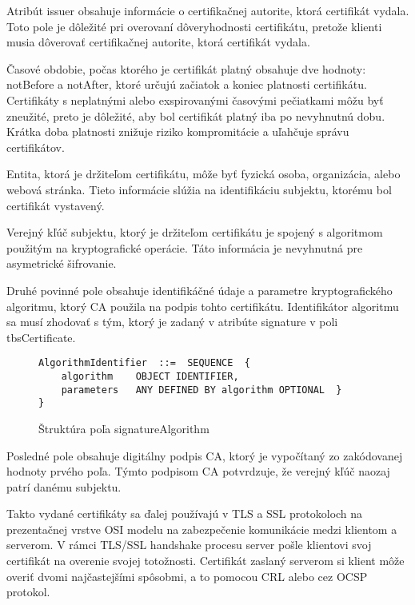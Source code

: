 \documentclass[12pt, twoside]{book}
\begin{document}
Atribút issuer obsahuje informácie o certifikačnej autorite, ktorá certifikát vydala. Toto pole je dôležité pri overovaní dôveryhodnosti certifikátu, pretože klienti musia dôverovať certifikačnej autorite, ktorá certifikát vydala.\cite{x509}  

Časové obdobie, počas ktorého je certifikát platný obsahuje dve hodnoty: notBefore a notAfter, ktoré určujú začiatok a koniec platnosti certifikátu. Certifikáty s neplatnými alebo exspirovanými časovými pečiatkami môžu byť  zneužité, preto je dôležité, aby bol certifikát platný iba po nevyhnutnú dobu. Krátka doba platnosti znižuje riziko kompromitácie a uľahčuje správu certifikátov.\cite{x509} 

Entita, ktorá je držiteľom certifikátu, môže byť fyzická osoba, organizácia, alebo webová stránka. Tieto informácie slúžia na identifikáciu subjektu, ktorému bol certifikát vystavený.\cite{x509}  

Verejný kľúč subjektu, ktorý je držiteľom certifikátu je spojený s algoritmom použitým na kryptografické operácie. Táto informácia je nevyhnutná pre asymetrické šifrovanie.\cite{x509} 

\newpage
Druhé povinné pole obsahuje identifikáčné údaje a parametre kryptografického algoritmu, ktorý CA použila na podpis tohto certifikátu. Identifikátor algoritmu sa musí zhodovať s tým, ktorý je zadaný v atribúte signature v poli tbsCertificate.\cite{x509} 

\begin{figure}[H]
\begin{lstlisting}
AlgorithmIdentifier  ::=  SEQUENCE  {
    algorithm    OBJECT IDENTIFIER,
    parameters   ANY DEFINED BY algorithm OPTIONAL  }
}
\end{lstlisting}
\caption{Štruktúra poľa signatureAlgorithm}
\end{figure}

Posledné pole obsahuje digitálny podpis CA, ktorý je vypočítaný zo zakódovanej hodnoty prvého poľa. Týmto podpisom CA potvrdzuje, že verejný kľúč naozaj patrí danému subjektu.\cite{x509} 

Takto vydané certifikáty sa ďalej používajú v TLS a SSL protokoloch na prezentačnej vrstve OSI modelu na zabezpečenie komunikácie medzi klientom a serverom. V rámci TLS/SSL handshake procesu server pošle klientovi svoj certifikát na overenie svojej totožnosti. Certifikát zaslaný serverom si klient môže overiť dvomi najčastejšími spôsobmi, a to pomocou CRL alebo cez OCSP protokol.\cite{certs2}
\end{document}

